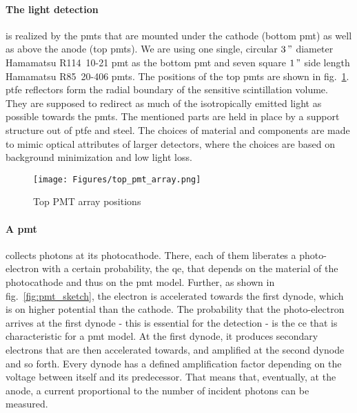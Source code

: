 \paragraph{The light detection} is realized by the \glspl{pmt} that are mounted under the cathode (bottom \gls{pmt}) as well as above the anode (top \glspl{pmt}).
We are using one single, circular $ 3\," $ diameter Hamamatsu R114~10-21 \gls{pmt} as the bottom \gls{pmt} and seven square $ 1\," $ side length Hamamatsu R85~20-406 \glspl{pmt}.
The positions of the top \glspl{pmt} are shown in fig.~\ref{fig:top-pmt-array}.
\gls{ptfe} reflectors form the radial boundary of the sensitive scintillation volume.
They are supposed to redirect as much of the isotropically emitted light as possible towards the \glspl{pmt}.
The mentioned parts are held in place by a support structure out of \gls{ptfe} and steel.
The choices of material and components are made to mimic optical attributes of larger detectors, where the choices are based on background minimization and low light loss.

\begin{figure}
    \centering
    \texttt{[image: Figures/top\_pmt\_array.png]}  %
    \caption[Top PMT array positions]{
    Top PMT array positions
    }
    \label{fig:top-pmt-array}
\end{figure}

\paragraph{A \gls{pmt}} collects photons at its photocathode.
There, each of them liberates a photo-electron with a certain probability, the \gls{qe}, that depends on the material of the photocathode and thus on the \gls{pmt} model.
Further, as shown in fig.~\ref{fig:pmt_sketch}, the electron is accelerated towards the first dynode, which is on higher potential than the cathode.
The probability that the photo-electron arrives at the first dynode - this is essential for the detection - is the \gls{ce} that is characteristic for a \gls{pmt} model.
At the first dynode, it produces secondary electrons that are then accelerated towards, and amplified at the second dynode and so forth.
Every dynode has a defined amplification factor depending on the voltage between itself and its predecessor.
That means that, eventually, at the anode, a current proportional to the number of incident photons can be measured.



